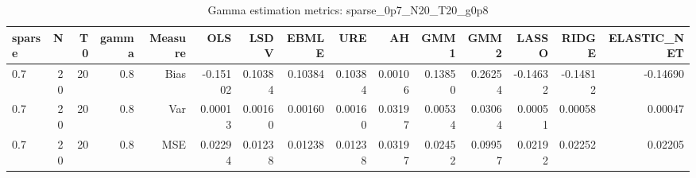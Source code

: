 \begin{table}[!htbp]\centering
\caption{Gamma estimation metrics: sparse_0p7_N20_T20_g0p8}
\label{tab:table1_sparse_0p7_N20_T20_g0p8}
\begin{tabular}{lrrrrrrrrrrrrrr}
\hline
sparse & N & T0 & gamma & Measure & OLS & LSDV & EBMLE & URE & AH & GMM1 & GMM2 & LASSO & RIDGE & ELASTIC_NET \\
\hline
0.7 & 20 & 20 & 0.8 & Bias & -0.15102 & 0.10384 & 0.10384 & 0.10384 & 0.00106 & 0.13850 & 0.26254 & -0.14632 & -0.14812 & -0.14690 \\
0.7 & 20 & 20 & 0.8 & Var & 0.00013 & 0.00160 & 0.00160 & 0.00160 & 0.03197 & 0.00534 & 0.03064 & 0.00051 & 0.00058 & 0.00047 \\
0.7 & 20 & 20 & 0.8 & MSE & 0.02294 & 0.01238 & 0.01238 & 0.01238 & 0.03197 & 0.02452 & 0.09957 & 0.02192 & 0.02252 & 0.02205 \\
\hline
\end{tabular}
\end{table}


